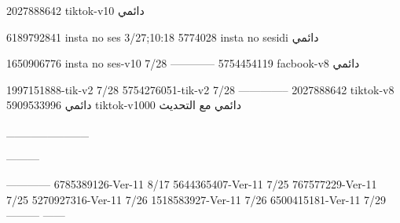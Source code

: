 2027888642 tiktok-v10
دائمي

6189792841 insta no ses
3/27;10:18
5774028 insta no sesidi
دائمي

1650906776 insta no ses-v10
7/28
------------
5754454119 facbook-v8
دائمي

1997151888-tik-v2
7/28
5754276051-tik-v2
7/28
--------------
2027888642 tiktok-v8
دائمي
5909533996 tiktok-v1000
دائمي مع التحديث

__________

---------

------------
6785389126-Ver-11
8/17
5644365407-Ver-11
7/25
767577229-Ver-11
7/25
5270927316-Ver-11
7/26
1518583927-Ver-11
7/26
6500415181-Ver-11
7/29
---------
------
